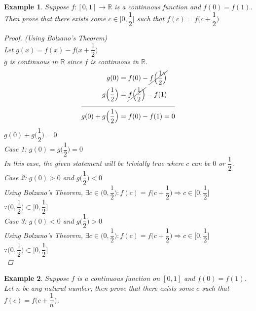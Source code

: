 \documentclass[14]{article}
\newtheorem*{ex}{Example}
\begin{document}
\begin{ex}
Suppose $f:[0, 1] \to \mathbb{R}$ is a continuous function and $f(0) = f(1)$. Then prove that there exists some $c \in \Big[0, \dfrac{1}{2}\Big]$ such that $f(c) = f\Big(c + \dfrac{1}{2}\Big)$
\begin{proof} (Using Bolzano's Theorem)\\
Let $g(x) = f(x) - f\Big(x + \dfrac{1}{2}\Big)$\\
$g$ is continuous in $\mathbb{R}$ since $f$ is continuous in $\mathbb{R}$.\\
\begin{align}
g(0) &= f(0) - \cancel{f\Big(\dfrac{1}{2}\Big)}\\
g\Big(\dfrac{1}{2}\Big) &= \cancel{f\Big(\dfrac{1}{2}\Big)} - f(1)\\
\cline{1-2}
g(0)+g\Big(\dfrac{1}{2}\Big) &= f(0) - f(1) = 0
\end{align}
$g(0)+g\Big(\dfrac{1}{2}\Big) = 0$\\
\textit{Case 1:} $g(0)=g\Big(\dfrac{1}{2}\Big) = 0$\\
In this case, the given statement will be trivially true where $c$ can be $0$ or $\dfrac{1}{2}$.\\
\textit{Case 2:} $g(0) > 0$ and $g\Big(\dfrac{1}{2}\Big) < 0$\\
Using Bolzano's Theorem, $\exists c \in \Big(0, \dfrac{1}{2}\Big) : f(c) = f\Big(c + \dfrac{1}{2}\Big) \Rightarrow c \in \Big[0, \dfrac{1}{2}\Big]\;\;\;\;\;\;\;\;\;\;$ $\because \Big(0, \dfrac{1}{2}\Big) \subset \Big[0, \dfrac{1}{2}\Big] $\\
\textit{Case 3:} $g(0) < 0$ and $g\Big(\dfrac{1}{2}\Big) > 0$\\
Using Bolzano's Theorem, $\exists c \in \Big(0, \dfrac{1}{2}\Big) : f(c) = f\Big(c + \dfrac{1}{2}\Big) \Rightarrow c \in \Big[0, \dfrac{1}{2}\Big]\;\;\;\;\;\;\;\;\;\;$ $\because \Big(0, \dfrac{1}{2}\Big) \subset \Big[0, \dfrac{1}{2}\Big] $\\
\end{proof}
\end{ex}
\pagebreak
\begin{ex}
Suppose $f$ is a continuous function on $[0, 1]$ and $f(0) = f(1)$. Let $n$ be any natural number, then prove that there exists some $c$ such that $f(c) = f\Big(c + \dfrac{1}{n}\Big)$.
\end{ex}
\end{document}

